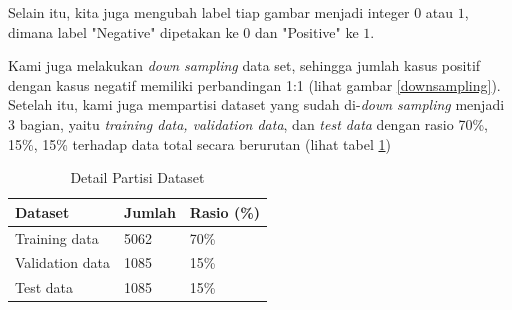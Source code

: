 Selain itu, kita juga mengubah label tiap gambar menjadi integer $0$ atau $1$, dimana label "Negative" dipetakan ke $0$ dan "Positive" ke $1$.

Kami juga melakukan \textit{down sampling} data set, sehingga jumlah kasus positif dengan kasus negatif memiliki perbandingan 1:1 (lihat gambar \ref{downsampling}). Setelah itu, kami juga mempartisi dataset yang sudah di-\textit{down sampling} menjadi 3 bagian, yaitu \textit{training data, validation data}, dan \textit{test data} dengan rasio 70\%, 15\%, 15\% terhadap data total secara berurutan (lihat tabel \ref{train-val-test})

\begin{table}[!ht]
    \centering

    \begin{tabular}{|l|l|l|}
    \hline
        Dataset & Jumlah & Rasio (\%) \\ \hline
        Training data & 5062 & 70\% \\ \hline
        Validation data & 1085 & 15\% \\ \hline
        Test data & 1085 & 15\% \\ \hline
    \end{tabular}

        \caption{Detail Partisi Dataset}
        
        \label{train-val-test}
\end{table}



